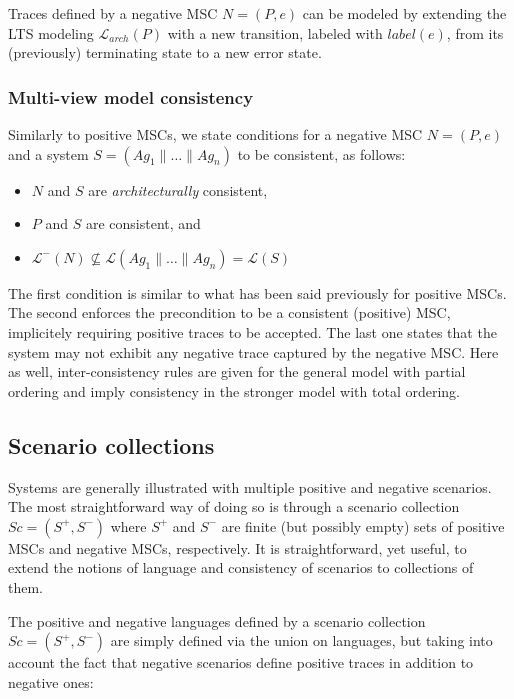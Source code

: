 Traces defined by a negative MSC $N = (P,e)$ can be modeled by extending the LTS modeling $\mathcal{L}_{arch}(P)$ with a new transition, labeled with $label(e)$, from its (previously) terminating state to a new error state.

\subsubsection*{Multi-view model consistency}

Similarly to positive MSCs, we state conditions for a negative MSC $N = (P,e)$ and a system $S = (Ag_1 \parallel \ldots \parallel Ag_n)$ to be consistent, as follows:

\begin{itemize}
\item $N$ and $S$ are \emph{architecturally} consistent,
\item $P$ and $S$ are consistent, and
\item $\mathcal{L}^{-}(N) \not\subseteq \mathcal{L}(Ag_1 \parallel \ldots \parallel Ag_n) = \mathcal{L}(S)$
\end{itemize}

The first condition is similar to what has been said previously for positive MSCs. The second enforces the precondition to be a consistent (positive) MSC, implicitely requiring positive traces to be accepted. The last one states that the system may not exhibit any negative trace captured by the negative MSC. Here as well, inter-consistency rules are given for the general model with partial ordering and imply consistency in the stronger model with total ordering.

\subsection{Scenario collections}

Systems are generally illustrated with multiple positive and negative scenarios. The most straightforward way of doing so is through a scenario collection $Sc = (S^+,S^-)$ where $S^+$ and $S^-$ are finite (but possibly empty) sets of positive MSCs and negative MSCs, respectively. It is straightforward, yet useful, to extend the notions of language and consistency of scenarios to collections of them. 

The positive and negative languages defined by a scenario collection $Sc = (S^+,S^-)$ are simply defined via the union on languages, but taking into account the fact that negative scenarios define positive traces in addition to negative ones:

